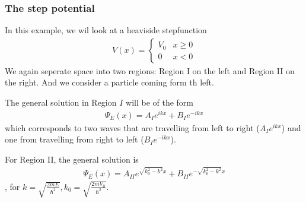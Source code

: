 \subsubsection{The step potential}
In this example, we wil look at a heaviside stepfunction
\begin{align*}
	V(x) = \left\{\begin{array}{ll}
		V_0 & x \geq 0 \\
		0 & x < 0
	\end{array} \right.
\end{align*}
We again seperate space into two regions: Region I on the left and Region II on the right. And we consider a particle coming form th left.

The general solution in Region $I$ will be of the form
\begin{align*}
	\Psi_E(x) = A_I e^{ikx} + B_Ie^{-ikx}
\end{align*}
which corresponds to two waves that are travelling from left to right ($A_Ie^{ikx}$) and one from travelling from right to left ($B_Ie^{-ikx}$).

For Region II, the general solution is
\begin{align*}
	\Psi_E(x) = A_{II}e^{\sqrt{k_0^2 - k^{2}}x} + B_{II}e^{-\sqrt{k_0^{2} - k^{2}}x}
\end{align*}
, for 
$k = \sqrt{\frac{2mE}{\hbar^{2}}}, k_0 = \sqrt{\frac{2mV_0}{\hbar^{2}}}$.

